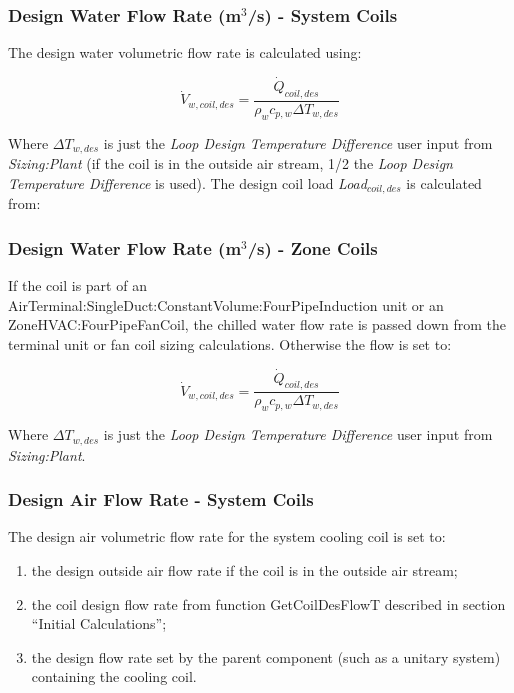 \subsubsection{Design Water Flow Rate (m\(^{3}\)/s) - System Coils}\label{design-water-flow-rate-m3s---system-coils}

The design water volumetric flow rate is calculated using:

\begin{equation}
\dot{V}_{w,coil,des} = \frac{\dot{Q}_{coil,des}}{\rho_w c_{p,w} \Delta T_{w,des}}
\end{equation}

Where \(\Delta T_{w,des}\) is just the \emph{Loop Design Temperature Difference} user input from \emph{Sizing:Plant} (if the coil is in the outside air stream, 1/2 the \emph{Loop Design Temperature Difference} is used). The design coil load \emph{Load\(_{coil,des}\)} is calculated from:

\subsubsection{Design Water Flow Rate (m\(^{3}\)/s) - Zone Coils}\label{design-water-flow-rate-m3s---zone-coils}

If the coil is part of an AirTerminal:SingleDuct:ConstantVolume:FourPipeInduction unit or an ZoneHVAC:FourPipeFanCoil, the chilled water flow rate is passed down from the terminal unit or fan coil sizing calculations. Otherwise the flow is set to:

\begin{equation}
\dot{V}_{w,coil,des} = \frac{\dot{Q}_{coil,des}}{\rho_w c_{p,w} \Delta T_{w,des}}
\end{equation}

Where \(\Delta T_{w,des}\) is just the \emph{Loop Design Temperature Difference} user input from \emph{Sizing:Plant}.

\subsubsection{Design Air Flow Rate - System Coils}\label{design-air-flow-rate---system-coils}

The design air volumetric flow rate for the system cooling coil is set to:

\begin{enumerate}
\def\labelenumi{\arabic{enumi}.}
\item
  the design outside air flow rate if the coil is in the outside air stream;
\item
  the coil design flow rate from function GetCoilDesFlowT described in section ``Initial Calculations'';
\item
  the design flow rate set by the parent component (such as a unitary system) containing the cooling coil.
\end{enumerate}


